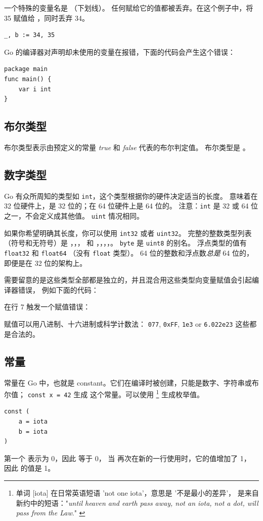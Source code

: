 一个特殊的变量名是 \var{\textbf{\_}} （下划线）。
任何赋给它的值都被丢弃。在这个例子中，将 35 赋值给 ，同时丢弃 34。
\begin{lstlisting}
_, b := 34, 35
\end{lstlisting}
Go 的编译器对声明却未使用的变量在报错，下面的代码会产生这个错误：

\begin{lstlisting}
package main
func main() { 
    var i int
}
\end{lstlisting}

\subsection{布尔类型}
布尔类型表示由预定义的常量 \emph{true} 和 \emph{false} 代表的布尔判定值。
布尔类型是 。

\subsection{数字类型}
Go 有众所周知的类型如 \lstinline{int}，这个类型根据你的硬件决定适当的长度。
意味着在 32 位硬件上，是 32 位的；在 64 位硬件上是 64 位的。
注意：\lstinline{int} 是 32 或 64 位之一，不会定义成其他值。
\lstinline{uint} 情况相同。

如果你希望明确其长度，你可以使用 \lstinline{int32} 或者 \lstinline{uint32}。
完整的整数类型列表（符号和无符号）是 
，，， 和
，，，，。
\lstinline{byte} 是 \lstinline{uint8} 的别名。
浮点类型的值有 \lstinline{float32} 和 \lstinline{float64}
（没有 \lstinline{float} 类型）。 
64 位的整数和浮点数\emph{总是} 64 位的，即便是在 32 位的架构上。

需要留意的是这些类型全部都是独立的，并且混合用这些类型向变量赋值会引起编译器错误，
例如下面的代码：

在行 7 触发一个赋值错误：

\noindent{}

赋值可以用八进制、十六进制或科学计数法：
\lstinline{077}, \lstinline{0xFF}, \lstinline{1e3} or
\mbox{\lstinline{6.022e23}} 这些都是合法的。

\subsection{常量}
\label{sec:constants}
常量在 Go 中，也就是 constant。它们在编译时被创建，只能是数字、字符串或布尔值；
\lstinline{const x = 42} 生成  这个常量。可以使用 
\footnote{单词 [iota] 在日常英语短语 'not one iota'，意思是 '不是最小的差异'，
是来自新约中的短语："\emph{until heaven and earth pass away, not an
iota, not a dot, will pass from the Law}." \cite{iota}}
生成枚举值。
\begin{lstlisting}
const (
	a = iota
	b = iota 
)
\end{lstlisting}
第一个  表示为 0，因此  等于 0，
当  再次在新的一行使用时，它的值增加了 1，
因此  的值是 1。

